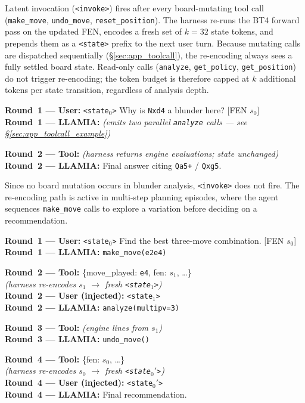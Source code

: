Latent invocation (\texttt{<invoke>}) fires after every board-mutating tool call
(\texttt{make\_move}, \texttt{undo\_move}, \texttt{reset\_position}).
The harness re-runs the BT4 forward pass on the updated FEN, encodes a fresh set of
$k{=}32$ state tokens, and prepends them as a \texttt{<state>} prefix to the next user
turn.
Because mutating calls are dispatched sequentially (\S\ref{sec:app_toolcall}), the
re-encoding always sees a fully settled board state.
Read-only calls (\texttt{analyze}, \texttt{get\_policy}, \texttt{get\_position}) do not
trigger re-encoding; the token budget is therefore capped at $k$ additional tokens per
state transition, regardless of analysis depth.

\begin{tcolorbox}[notebox, title={\texttt{<invoke>} Turn Structure: Blunder Analysis}]
\small
\textbf{Round~1 --- User:} \texttt{<state$_0$>} Why is \texttt{Nxd4} a blunder here?
[FEN $s_0$]\\[3pt]
\textbf{Round~1 --- LLAMIA:} \textit{(emits two parallel \texttt{analyze} calls ---
see \S\ref{sec:app_toolcall_example})}

\tcbline
\textbf{Round~2 --- Tool:} \textit{(harness returns engine evaluations; state unchanged)}\\[3pt]
\textbf{Round~2 --- LLAMIA:} Final answer citing \texttt{Qa5+} / \texttt{Qxg5}.
\end{tcolorbox}

Since no board mutation occurs in blunder analysis, \texttt{<invoke>} does not fire.
The re-encoding path is active in multi-step planning episodes, where the agent sequences
\texttt{make\_move} calls to explore a variation before deciding on a recommendation.

\begin{tcolorbox}[notebox, title={\texttt{<invoke>} Turn Structure: Multi-step Planning}]
\small
\textbf{Round~1 --- User:} \texttt{<state$_0$>} Find the best three-move combination.
[FEN $s_0$]\\[3pt]
\textbf{Round~1 --- LLAMIA:} \texttt{make\_move(e2e4)}

\tcbline
\textbf{Round~2 --- Tool:} \{move\_played: \texttt{e4}, fen: $s_1$, \ldots\}\\
\textit{(harness re-encodes $s_1$ $\!\to\!$ fresh \texttt{<state$_1$>})}\\[3pt]
\textbf{Round~2 --- User (injected):} \texttt{<state$_1$>}\\[3pt]
\textbf{Round~2 --- LLAMIA:} \texttt{analyze(multipv=3)}

\tcbline
\textbf{Round~3 --- Tool:} \textit{(engine lines from $s_1$)}\\[3pt]
\textbf{Round~3 --- LLAMIA:} \texttt{undo\_move()}

\tcbline
\textbf{Round~4 --- Tool:} \{fen: $s_0$, \ldots\}\\
\textit{(harness re-encodes $s_0$ $\!\to\!$ fresh \texttt{<state$_0'$>})}\\[3pt]
\textbf{Round~4 --- User (injected):} \texttt{<state$_0'$>}\\[3pt]
\textbf{Round~4 --- LLAMIA:} Final recommendation.
\end{tcolorbox}

